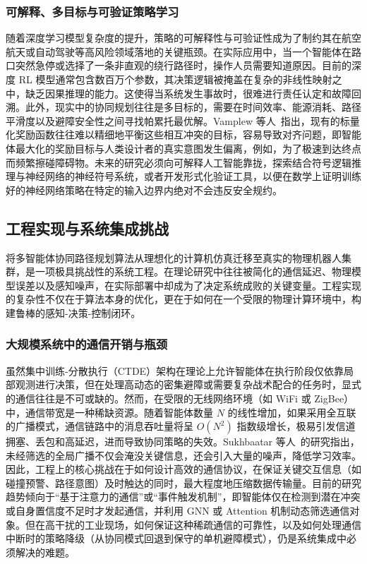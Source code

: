 \documentclass[13.5pt]{extarticle}
\begin{document}
\subsubsection{可解释、多目标与可验证策略学习}

随着深度学习模型复杂度的提升，策略的可解释性与可验证性成为了制约其在航空航天或自动驾驶等高风险领域落地的关键瓶颈。在实际应用中，当一个智能体在路口突然急停或选择了一条非直观的绕行路径时，操作人员需要知道原因。目前的深度 RL 模型通常包含数百万个参数，其决策逻辑被掩盖在复杂的非线性映射之中，缺乏因果推理的能力。这使得当系统发生事故时，很难进行责任认定和故障回溯。此外，现实中的协同规划往往是多目标的，需要在时间效率、能源消耗、路径平滑度以及避障安全性之间寻找帕累托最优解。Vamplew 等人~\cite{vamplew2018human}指出，现有的标量化奖励函数往往难以精细地平衡这些相互冲突的目标，容易导致对齐问题，即智能体最大化的奖励目标与人类设计者的真实意图发生偏离，例如，为了极速到达终点而频繁擦碰障碍物。未来的研究必须向可解释人工智能靠拢，探索结合符号逻辑推理与神经网络的神经符号系统，或者开发形式化验证工具，以便在数学上证明训练好的神经网络策略在特定的输入边界内绝对不会违反安全规约。

\subsection{工程实现与系统集成挑战}

将多智能体协同路径规划算法从理想化的计算机仿真迁移至真实的物理机器人集群，是一项极具挑战性的系统工程。在理论研究中往往被简化的通信延迟、物理模型误差以及感知噪声，在实际部署中却成为了决定系统成败的关键变量。工程实现的复杂性不仅在于算法本身的优化，更在于如何在一个受限的物理计算环境中，构建鲁棒的感知-决策-控制闭环。

\subsubsection{大规模系统中的通信开销与瓶颈}

虽然集中训练-分散执行（CTDE）架构在理论上允许智能体在执行阶段仅依靠局部观测进行决策，但在处理高动态的密集避障或需要复杂战术配合的任务时，显式的通信往往是不可或缺的。然而，在受限的无线网络环境（如 WiFi 或 ZigBee）中，通信带宽是一种稀缺资源。随着智能体数量 $N$ 的线性增加，如果采用全互联的广播模式，通信链路中的消息吞吐量将呈 $O(N^2)$ 指数级增长，极易引发信道拥塞、丢包和高延迟，进而导致协同策略的失效。Sukhbaatar 等人~\cite{sukhbaatar2016learning}的研究指出，未经筛选的全局广播不仅会淹没关键信息，还会引入大量的噪声，降低学习效率。因此，工程上的核心挑战在于如何设计高效的通信协议，在保证关键交互信息（如碰撞预警、路径意图）及时触达的同时，最大程度地压缩数据传输量。目前的研究趋势倾向于“基于注意力的通信”或“事件触发机制”，即智能体仅在检测到潜在冲突或自身置信度不足时才发起通信，并利用 GNN 或 Attention 机制动态筛选通信对象。但在高干扰的工业现场，如何保证这种稀疏通信的可靠性，以及如何处理通信中断时的策略降级（从协同模式回退到保守的单机避障模式），仍是系统集成中必须解决的难题。
\end{document}

